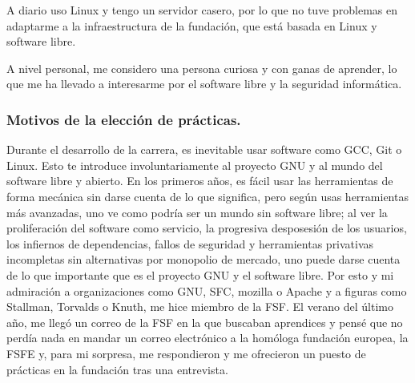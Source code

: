     A diario uso Linux y tengo un servidor casero, por lo que no tuve problemas en adaptarme a la infraestructura de la fundación, que está basada en Linux y software libre.

    A nivel personal, me considero una persona curiosa y con ganas de aprender, lo que me ha llevado a interesarme por el software libre y la seguridad informática.

\subsubsection{Motivos de la elección de prácticas.}\label{subsubsec:motivos-eleccion}
    Durante el desarrollo de la carrera, es inevitable usar software como GCC, Git o Linux.
    Esto te introduce involuntariamente al proyecto GNU y al mundo del software libre y abierto.
    En los primeros años, es fácil usar las herramientas de forma mecánica sin darse cuenta de lo que significa, pero según usas herramientas más avanzadas, uno ve como podría ser un mundo sin software libre;
    al ver la proliferación del software como servicio, la progresiva desposesión de los usuarios, los infiernos de dependencias, fallos de seguridad y herramientas privativas incompletas sin alternativas por monopolio de mercado, uno puede darse cuenta de lo que importante que es
    el proyecto GNU y el software libre.
    Por esto y mi admiración a organizaciones como GNU, SFC, mozilla o Apache y a figuras como Stallman, Torvalds o Knuth, me hice miembro de la FSF\@.
    El verano del último año, me llegó un correo de la FSF en la que buscaban aprendices y pensé que no perdía nada en mandar un correo electrónico a la homóloga fundación europea,
    la FSFE y, para mi sorpresa, me respondieron y me ofrecieron un puesto de prácticas en la fundación tras una entrevista.

